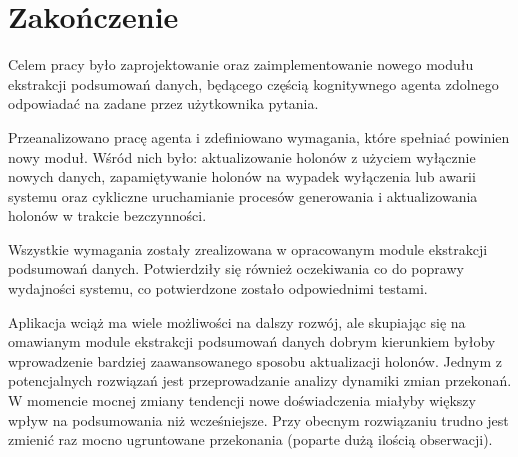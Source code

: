 \chapter*{Zakończenie}

Celem pracy było zaprojektowanie oraz zaimplementowanie nowego modułu ekstrakcji podsumowań danych, będącego częścią kognitywnego agenta zdolnego odpowiadać na zadane przez użytkownika pytania.

Przeanalizowano pracę agenta i zdefiniowano wymagania, które spełniać powinien nowy moduł. Wśród nich było: aktualizowanie holonów z użyciem wyłącznie nowych danych, zapamiętywanie holonów na wypadek wyłączenia lub awarii systemu oraz cykliczne uruchamianie procesów generowania i aktualizowania holonów w trakcie bezczynności.

Wszystkie wymagania zostały zrealizowana w opracowanym module ekstrakcji podsumowań danych. Potwierdziły się również oczekiwania co do poprawy wydajności systemu, co potwierdzone zostało odpowiednimi testami.

Aplikacja wciąż ma wiele możliwości na dalszy rozwój, ale skupiając się na omawianym module ekstrakcji podsumowań danych dobrym kierunkiem byłoby wprowadzenie bardziej zaawansowanego sposobu aktualizacji holonów. Jednym z potencjalnych rozwiązań jest przeprowadzanie analizy dynamiki zmian przekonań. W momencie mocnej zmiany tendencji nowe doświadczenia miałyby większy wpływ na podsumowania niż wcześniejsze. Przy obecnym rozwiązaniu trudno jest zmienić raz mocno ugruntowane przekonania (poparte dużą ilością obserwacji).